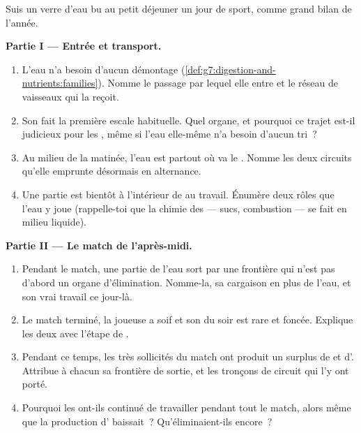 \begin{problem}\label{pb:g7:removing-wastes:1}
Suis un verre d'eau bu au petit déjeuner un jour de sport, comme
grand bilan de l'année.

\medskip\noindent\textbf{Partie I --- Entrée et transport.}
\begin{enumerate}
  \item L'eau n'a besoin d'aucun démontage
        (\cref{def:g7:digestion-and-nutrients:families}). Nomme le
        passage par lequel elle entre et le réseau de vaisseaux qui
        la reçoit.
  \item Son  fait la première escale habituelle. Quel organe, et
        pourquoi ce trajet est-il judicieux pour les ,
        même si l'eau elle-même n'a besoin d'aucun tri~?
  \item Au milieu de la matinée, l'eau est partout où va le .
        Nomme les deux circuits qu'elle emprunte désormais en
        alternance.
  \item Une partie est bientôt à l'intérieur de  au travail.
        Énumère deux rôles que l'eau y joue (rappelle-toi que la
        chimie des  --- sucs, combustion --- se fait en
        milieu liquide).
\end{enumerate}

\medskip\noindent\textbf{Partie II --- Le match de
l'après-midi.}
\begin{enumerate}[resume]
  \item Pendant le match, une partie de l'eau sort par une frontière
        qui n'est pas d'abord un organe d'élimination. Nomme-la, sa
        cargaison en plus de l'eau, et son vrai travail ce jour-là.
  \item Le match terminé, la joueuse a soif et son  du soir est
        rare et foncée. Explique les deux avec l'étape de
        .
  \item Pendant ce temps, les  très sollicités du match ont
        produit un surplus de  et d'. Attribue
        à chacun sa frontière de sortie, et les tronçons de circuit
        qui l'y ont porté.
  \item Pourquoi les  ont-ils continué de travailler pendant
        tout le match, alors même que la production d'
        baissait~? Qu'éliminaient-ils encore~?
\end{enumerate}


\end{problem}
